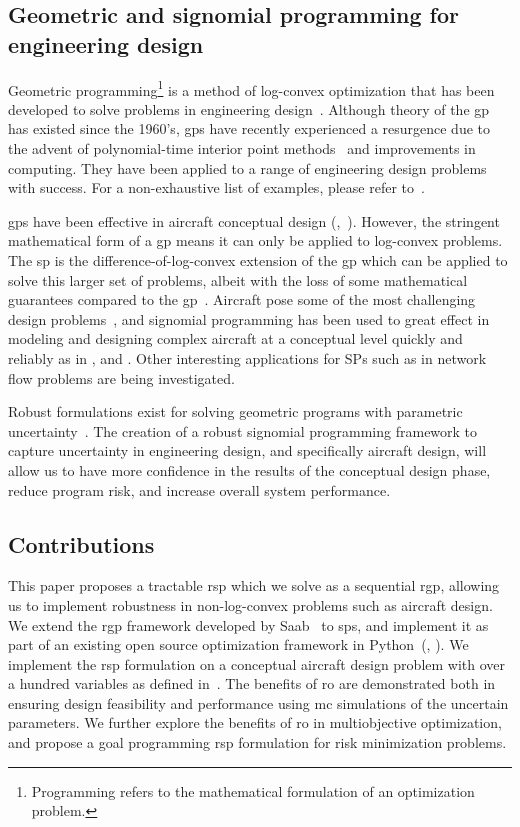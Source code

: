 \subsection{Geometric and signomial programming for engineering design}

Geometric programming\footnote{Programming refers to the mathematical formulation of an optimization problem.}
is a method of log-convex optimization that has been developed
to solve problems in engineering design~\cite{Duffin1967}. Although theory of the \gls{gp} has existed since
the 1960's, \gls{gp}s have recently experienced a resurgence due to the advent of polynomial-time
interior point methods~\cite{Nesterov1994} and improvements in computing. They have been
applied to a range of engineering design problems with success. For a non-exhaustive list of examples,
please refer to~\cite{Boyd2007}.

\gls{gp}s have been effective in aircraft conceptual design
(\cite{Hoburg2013},~\cite{Burton2018}).
However, the stringent mathematical form of a \gls{gp} means it can only be applied to log-convex problems.
The \gls{sp} is the difference-of-log-convex extension of the \gls{gp} which can be applied to
solve this larger set of problems, albeit with the loss of some mathematical guarantees compared to the \gls{gp}~\cite{Kirschen2018}.
Aircraft pose some of the most challenging design problems~\cite{York2018}, and signomial programming
has been used to great effect in modeling and designing complex aircraft at a conceptual level quickly
and reliably as in \cite{York2018}, \cite{Kirschen2018} and \cite{Kirschen2016}.
Other interesting applications for SPs such as in network flow problems are being investigated.

Robust formulations exist for solving geometric programs with parametric uncertainty~\cite{Saab2018}.
The creation of a robust signomial programming framework to capture uncertainty in engineering
design, and specifically aircraft design, will allow us to have more confidence in the results
of the conceptual design phase, reduce program risk, and increase overall system performance.

\subsection{Contributions}

This paper proposes a tractable \gls{rsp} which we solve as a sequential \gls{rgp},
allowing us to implement robustness in non-log-convex problems such as aircraft design.
We extend the \gls{rgp} framework developed by Saab~\cite{Saab2018} to \gls{sp}s, {\color{blue}and implement
it as part of an existing open source optimization framework in Python~(\cite{robust}, \cite{gpkit}).}
We implement the \gls{rsp} formulation on a conceptual aircraft design problem with over a hundred
variables as defined in~\cite{Ozturk2018}.
The benefits of \gls{ro} are demonstrated both in ensuring design feasibility and performance
using \gls{mc} simulations of the uncertain parameters.
We further explore the benefits of \gls{ro} in multiobjective optimization, and propose
a goal programming \gls{rsp} formulation for risk minimization problems.


